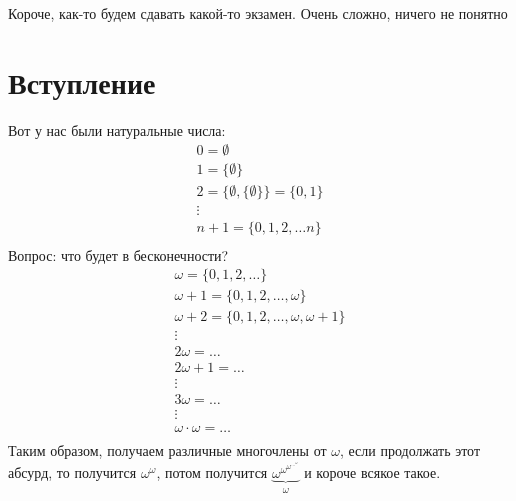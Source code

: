 
Короче, как-то будем сдавать какой-то экзамен. Очень сложно, ничего не понятно

\section{Вступление}
Вот у нас были натуральные числа:
\[
\begin{array}{c}
    0 = \emptyset \\
    1 = \{\emptyset\} \\
    2 = \{\emptyset, \{\emptyset\}\} = \{0, 1\} \\
    \vdots\\
    n + 1 = \{0, 1, 2, \dots n\} \\
\end{array}
\]
Вопрос: что будет в бесконечности?
\[
\begin{array}{c}
    \omega = \{0, 1, 2, \dots\} \\ 
    \omega + 1 = \{0, 1, 2, \dots, \omega\} \\ 
    \omega + 2 = \{0, 1, 2, \dots, \omega, \omega + 1\} \\
    \vdots \\
    2\omega = \dots\\
    2\omega + 1 = \dots\\
    \vdots\\
    3\omega = \dots\\
    \vdots\\
    \omega\cdot\omega = \dots\\
\end{array}
\]
Таким образом, получаем различные многочлены от \(\omega\), если продолжать этот абсурд, то получится \(\omega^\omega\), потом получится \(\underbrace{\omega^{\omega^{\omega^{\dots^\omega}}}}_{\omega} \) и короче всякое такое.

